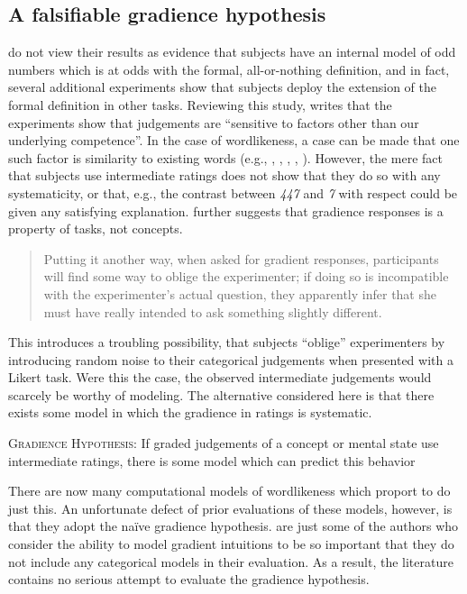 \subsection{A falsifiable gradience hypothesis}

\citeauthor{Armstrong1983} do not view their results as evidence that subjects have an internal model of odd numbers which is at odds with the formal, all-or-nothing definition, and in fact, several additional experiments show that subjects deploy the extension of the formal definition in other tasks. Reviewing this study, \citet[215]{Schutze2011} writes that the experiments show that judgements are ``sensitive to factors other than our underlying competence''. In the case of wordlikeness, a case can be made that one such factor is similarity to existing words (e.g., \citealt[][151, fn. 27]{LSLT}, \citealt{Greenberg1964}, \citealt{Ohala1986b}, \citealt{Bailey2001}, \citealt{Schutze2005}). However, the mere fact that subjects use intermediate ratings does not show that they do so with any systematicity, or that, e.g., the contrast between \emph{447} and \emph{7} with respect could be given any satisfying explanation. \citeauthor{Schutze2011} further suggests that gradience responses is a property of tasks, not concepts.

\begin{quote}
Putting it another way, when asked for gradient responses, participants will find some way to oblige the experimenter; if doing so is incompatible with the experimenter's actual question, they apparently infer that she must have really intended to ask something slightly different. \citep[][215]{Schutze2011}
\end{quote}

This introduces a troubling possibility, that subjects ``oblige'' experimenters by introducing random noise to their categorical judgements when presented with a Likert task. Were this the case, the observed intermediate judgements would scarcely be worthy of modeling. The alternative considered here is that there exists some model in which the gradience in ratings is systematic. 

\begin{unlabeledexample}
\textsc{Gradience Hypothesis}: If graded judgements of a concept or mental state use intermediate ratings, there is some model which can predict this behavior
\end{unlabeledexample}

\noindent There are now many computational models of wordlikeness which proport to do just this. An unfortunate defect of prior evaluations of these models, however, is that they adopt the naïve gradience hypothesis. \citet[382]{Hayes2008a} are just some of the authors who consider the ability to model gradient intuitions to be so important that they do not include any categorical models in their evaluation. As a result, the literature contains no serious attempt to evaluate the gradience hypothesis.

